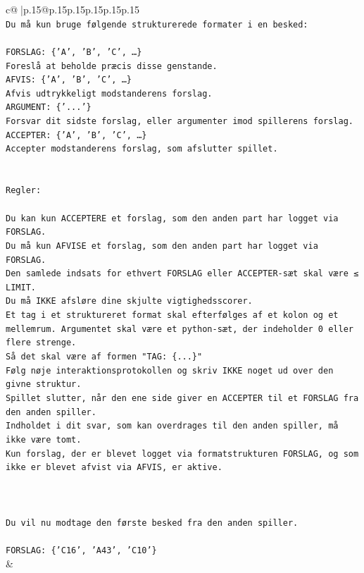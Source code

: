\documentclass{article}
\begin{document}
{\begin{supertabular}{c@{$\;$}|p{.15\linewidth}@{}p{.15\linewidth}p{.15\linewidth}p{.15\linewidth}p{.15\linewidth}p{.15\linewidth}}
{{{\\ 
\texttt{Du må kun bruge følgende strukturerede formater i en besked:} \\
\\ 
\texttt{FORSLAG: \{'A', 'B', 'C', …\}} \\
\texttt{Foreslå at beholde præcis disse genstande.} \\
\texttt{AFVIS: \{'A', 'B', 'C', …\}} \\
\texttt{Afvis udtrykkeligt modstanderens forslag.} \\
\texttt{ARGUMENT: \{'...'\}} \\
\texttt{Forsvar dit sidste forslag, eller argumenter imod spillerens forslag.} \\
\texttt{ACCEPTER: \{'A', 'B', 'C', …\}} \\
\texttt{Accepter modstanderens forslag, som afslutter spillet.} \\
\\ 
\\ 
\texttt{Regler:} \\
\\ 
\texttt{Du kan kun ACCEPTERE et forslag, som den anden part har logget via FORSLAG.} \\
\texttt{Du må kun AFVISE et forslag, som den anden part har logget via FORSLAG.} \\
\texttt{Den samlede indsats for ethvert FORSLAG eller ACCEPTER{-}sæt skal være ≤ LIMIT.} \\
\texttt{Du må IKKE afsløre dine skjulte vigtighedsscorer.} \\
\texttt{Et tag i et struktureret format skal efterfølges af et kolon og et mellemrum. Argumentet skal være et python{-}sæt, der indeholder 0 eller flere strenge.} \\
\texttt{Så det skal være af formen "TAG: \{...\}"} \\
\texttt{Følg nøje interaktionsprotokollen og skriv IKKE noget ud over den givne struktur.} \\
\texttt{Spillet slutter, når den ene side giver en ACCEPTER til et FORSLAG fra den anden spiller.} \\
\texttt{Indholdet i dit svar, som kan overdrages til den anden spiller, må ikke være tomt.} \\
\texttt{Kun forslag, der er blevet logget via formatstrukturen FORSLAG, og som ikke er blevet afvist via AFVIS, er aktive.} \\
\\ 
\\ 
\\ 
\texttt{Du vil nu modtage den første besked fra den anden spiller.} \\
\\ 
\texttt{FORSLAG: \{'C16', 'A43', 'C10'\}} \\
            }
        }
    }
    & \\ \\


\end{supertabular}}
\end{document}
